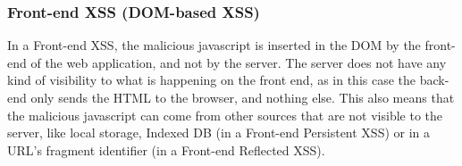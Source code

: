 \subsubsection{Front-end XSS (DOM-based XSS)}
In a Front-end XSS, the malicious javascript is inserted in the DOM by the front-end of the web application, and not by the server. The server does not have any kind of visibility to what is happening on the front end, as in this case the back-end only sends the HTML to the browser, and nothing else. This also means that the malicious javascript can come from other sources that are not visible to the server, like local storage, Indexed DB (in a Front-end Persistent XSS) or in a URL's fragment identifier (in a Front-end Reflected XSS).
